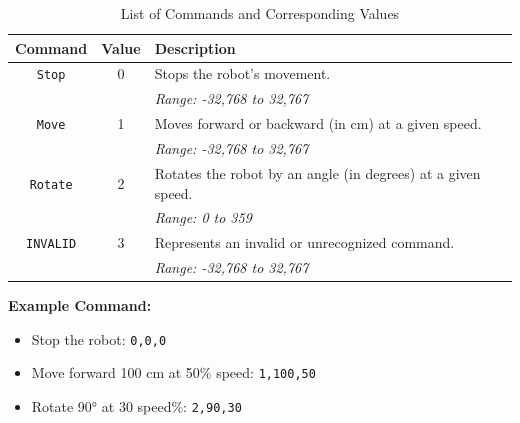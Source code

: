 \begin{table}[H]
	\centering
	\caption{List of Commands and Corresponding Values}
	\label{tab:commands}
	\begin{tabular}{|c|c|l|}
		\hline
		\textbf{Command} & \textbf{Value} & \textbf{Description} \\ \hline
		\texttt{Stop}     & 0              & Stops the robot's movement. \\
		& & \textit{Range: -32,768 to 32,767} \\ \hline
		\texttt{Move}     & 1              & Moves forward or backward (in cm) at a given speed. \\
		& & \textit{Range: -32,768 to 32,767} \\ \hline
		\texttt{Rotate}   & 2              & Rotates the robot by an angle (in degrees) at a given speed. \\
		& & \textit{Range: 0 to 359} \\ \hline
		\texttt{INVALID}  & 3              & Represents an invalid or unrecognized command. \\
		& & \textit{Range: -32,768 to 32,767} \\ \hline
	\end{tabular}
\end{table}

\textbf{Example Command:}
\begin{itemize}
	\item Stop the robot: \texttt{0,0,0}
	\item Move forward 100 cm at 50\% speed:  \texttt{1,100,50}
	\item Rotate 90° at 30 speed\%: \texttt{2,90,30}
\end{itemize}

